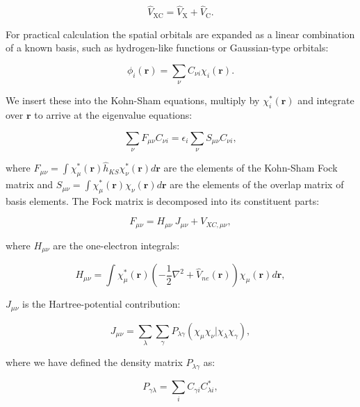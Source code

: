 \begin{equation}
\hat{V}_{\text{XC}} = \hat{V}_{\text{X}} + \hat{V}_{\text{C}} .
\end{equation}

For practical calculation the
spatial orbitals are expanded as a linear combination
of a known basis, such as hydrogen-like functions
or Gaussian-type orbitals:

\begin{equation}
 \phi_i(\bm{r}) = \sum_{\nu} C_{\nu i} \chi_i (\bm{r}) .
\end{equation}

We insert these into the Kohn-Sham equations, multiply
by $\chi_i^*(\bm{r})$ and integrate over $\bm{r}$ to arrive
at the eigenvalue equations:

\begin{equation}
 \sum_{\nu} F_{\mu\nu} C_{\nu i} =
    \epsilon_i \sum_{\nu} S_{\mu\nu} C_{\nu i} ,
\end{equation}

where $F_{\mu\nu} = \int \chi_{\mu}^*(\bm{r}) \hat{h}_{KS}
\chi_{\nu}^*(\bm{r}) d\bm{r} $ are the elements of the Kohn-Sham
Fock matrix and $S_{\mu\nu} = \int \chi_{\mu}^*(\bm{r}) \chi_{\nu}
(\bm{r}) d\bm{r}$ are the elements of the overlap matrix
of basis elements.
The Fock matrix is decomposed into its constituent parts:

\begin{equation}
F_{\mu\nu} = H_{\mu\nu} \ J_{\mu\nu} + V_{XC,\mu\nu} ,
\end{equation}

where $H_{\mu\nu}$ are the one-electron integrals:

\begin{equation}
H_{\mu\nu} = \int \chi_{\mu}^*(\bm{r})
    \left( -\frac{1}{2} \nabla^2 + \hat{V}_{ne}(\bm{r}) \right)
    \chi_{\mu}(\bm{r}) d\bm{r} ,
\end{equation}

$J_{\mu\nu}$ is the Hartree-potential contribution:

\begin{equation}
    J_{\mu\nu} = \sum_{\lambda} \sum_{\gamma} P_{\lambda\gamma}
    \left(\chi_{\mu}\chi_{\nu} | \chi_{\lambda}\chi_{\gamma}\right) ,
\end{equation}

where we have defined the density matrix $P_{\lambda\gamma}$ as:

\begin{equation}
P_{\gamma\lambda} = \sum_i C_{\gamma i} C_{\lambda i}^* ,
\end{equation}

